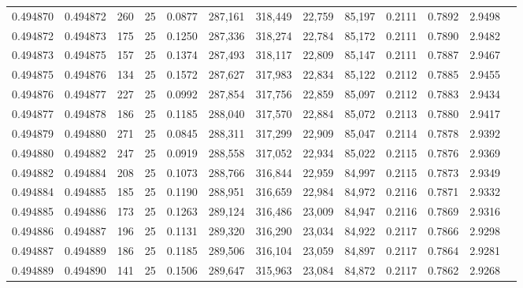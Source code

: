 \begin{tabular}{rrrrrrrrrrrrr}
0.494870 & 0.494872 &   260 &  25 &                                     0.0877 & 287,161 & 318,449 &  22,759 &  85,197 & 0.2111 & 0.7892 & 2.9498 \\
0.494872 & 0.494873 &   175 &  25 &                                     0.1250 & 287,336 & 318,274 &  22,784 &  85,172 & 0.2111 & 0.7890 & 2.9482 \\
0.494873 & 0.494875 &   157 &  25 &                                     0.1374 & 287,493 & 318,117 &  22,809 &  85,147 & 0.2111 & 0.7887 & 2.9467 \\
0.494875 & 0.494876 &   134 &  25 &                                     0.1572 & 287,627 & 317,983 &  22,834 &  85,122 & 0.2112 & 0.7885 & 2.9455 \\
0.494876 & 0.494877 &   227 &  25 &                                     0.0992 & 287,854 & 317,756 &  22,859 &  85,097 & 0.2112 & 0.7883 & 2.9434 \\
0.494877 & 0.494878 &   186 &  25 &                                     0.1185 & 288,040 & 317,570 &  22,884 &  85,072 & 0.2113 & 0.7880 & 2.9417 \\
0.494879 & 0.494880 &   271 &  25 &                                     0.0845 & 288,311 & 317,299 &  22,909 &  85,047 & 0.2114 & 0.7878 & 2.9392 \\
0.494880 & 0.494882 &   247 &  25 &                                     0.0919 & 288,558 & 317,052 &  22,934 &  85,022 & 0.2115 & 0.7876 & 2.9369 \\
0.494882 & 0.494884 &   208 &  25 &                                     0.1073 & 288,766 & 316,844 &  22,959 &  84,997 & 0.2115 & 0.7873 & 2.9349 \\
0.494884 & 0.494885 &   185 &  25 &                                     0.1190 & 288,951 & 316,659 &  22,984 &  84,972 & 0.2116 & 0.7871 & 2.9332 \\
0.494885 & 0.494886 &   173 &  25 &                                     0.1263 & 289,124 & 316,486 &  23,009 &  84,947 & 0.2116 & 0.7869 & 2.9316 \\
0.494886 & 0.494887 &   196 &  25 &                                     0.1131 & 289,320 & 316,290 &  23,034 &  84,922 & 0.2117 & 0.7866 & 2.9298 \\
0.494887 & 0.494889 &   186 &  25 &                                     0.1185 & 289,506 & 316,104 &  23,059 &  84,897 & 0.2117 & 0.7864 & 2.9281 \\
0.494889 & 0.494890 &   141 &  25 &                                     0.1506 & 289,647 & 315,963 &  23,084 &  84,872 & 0.2117 & 0.7862 & 2.9268 \\

\end{tabular}
